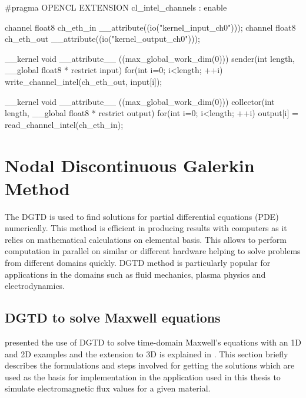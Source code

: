 \begin{CppCode}[caption=IO channels usage example in a OpenCL™ kernel, frame=tlrb, label=code:board_spec]
#pragma OPENCL EXTENSION cl_intel_channels : enable

channel float8 ch_eth_in __attribute((io("kernel_input_ch0")));
channel float8 ch_eth_out __attribute((io("kernel_output_ch0")));

__kernel void __attribute__ ((max_global_work_dim(0)))
sender(int length, __global float8 * restrict input)
{
    for(int i=0; i<length; ++i)
        write_channel_intel(ch_eth_out, input[i]);
}

__kernel void __attribute__ ((max_global_work_dim(0)))
collector(int length, __global float8 * restrict output)
{
    for(int i=0; i<length; ++i)
        output[i] = read_channel_intel(ch_eth_in);
}
\end{CppCode}

\section{Nodal Discontinuous Galerkin Method}
\label{sec:dgtd}

The \ac{DGTD} \cite{hesthaven_nodal_2008} is used to find solutions
for partial differential equations (PDE) numerically. This method is efficient in
producing results with computers as it relies on mathematical calculations on elemental basis.
This allows to perform computation in parallel on similar or different hardware helping to
solve problems from different domains quickly. \ac{DGTD} method is particularly popular for applications
in the domains such as fluid mechanics, plasma physics and electrodynamics.

\subsection{DGTD to solve Maxwell equations}
\label{sec:dgtd_maxwell}

\textcite{Hesthaven_190449} presented the use of \ac{DGTD} to solve time-domain Maxwell's equations with
an 1D and 2D examples and the extension to 3D is explained in \cite{hesthaven_nodal_2008}. This section
briefly describes the formulations and steps involved for getting the solutions which are
used as the basis for implementation in the application used in this thesis to simulate
electromagnetic flux values for a given material.

